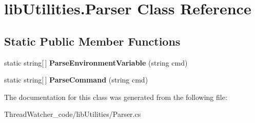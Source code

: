 \hypertarget{classlib_utilities_1_1_parser}{\section{lib\+Utilities.\+Parser Class Reference}
\label{classlib_utilities_1_1_parser}
}
\subsection*{Static Public Member Functions}
\begin{DoxyCompactItemize}
\item 
\hypertarget{classlib_utilities_1_1_parser_a82c91cd83b939fb83fe7342aaa66029b}{static string\mbox{[}$\,$\mbox{]} {\bfseries Parse\+Environment\+Variable} (string cmd)}\label{classlib_utilities_1_1_parser_a82c91cd83b939fb83fe7342aaa66029b}

\item 
\hypertarget{classlib_utilities_1_1_parser_ae1d9c9f34486da7e1d6dbd42821be6c9}{static string\mbox{[}$\,$\mbox{]} {\bfseries Parse\+Command} (string cmd)}\label{classlib_utilities_1_1_parser_ae1d9c9f34486da7e1d6dbd42821be6c9}

\end{DoxyCompactItemize}


The documentation for this class was generated from the following file\+:\begin{DoxyCompactItemize}
\item 
Thread\+Watcher\+\_\+code/lib\+Utilities/Parser.\+cs\end{DoxyCompactItemize}
